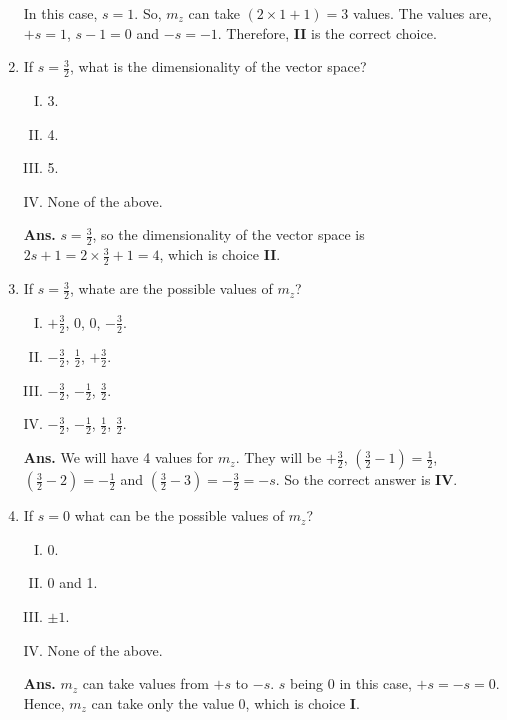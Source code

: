\documentclass[12pt]{article}
\newcommand\half{\frac{1}{2}}
\newcommand\thalf{\frac{3}{2}}
\begin{document}
\begin{enumerate}[1.]
In this case, $s=1$. So, $m_z$ can take $(2 \times 1 + 1) = 3$ values. The values are, $+s = 1$, $ s-1 = 0$ and $-s = -1$. Therefore, \textbf{II} is the correct choice.
\item If $s=\thalf$, what is the dimensionality of the vector space?
       \begin{enumerate}[I.]
              \item 3.
              \item 4.
              \item 5.
              \item None of the above. \\ \newline
       \end{enumerate}
\textbf{Ans.} $s=\thalf$, so the dimensionality of the vector space is $2s+1 = 2 \times \thalf + 1 = 4$, which is choice \textbf{II}. \newline
\item If $s=\thalf$, whate are the possible values of $m_z$?
       \begin{enumerate}[I.]
              \item $+\thalf$, 0, 0, $-\thalf$.
              \item $-\thalf$, $\half$, $+\thalf$.
              \item $-\thalf$, $-\half$, $\thalf$.
              \item $-\thalf$, $-\half$, $\half$, $\thalf$. \\ \newline
       \end{enumerate} 
\textbf{Ans.} We will have 4 values for $m_z$. They will be $+\thalf$, $\left(\thalf - 1 \right) = \half$, $\left(\thalf - 2 \right) = -\half$ and $\left(\thalf - 3 \right) = -\thalf = - s$. \newline
So the correct answer is \textbf{IV}. \\ \newline
\item If $s=0$ what can be the possible values of $m_z$?
       \begin{enumerate}[I.]
              \item 0.
              \item 0 and 1.
              \item $\pm 1$.
              \item None of the above. \\ \newline
       \end{enumerate}
\textbf{Ans.} $m_z$ can take values from $+s$ to $-s$. $s$ being 0 in this case, $+s=-s=0$. Hence, $m_z$ can take only the value 0, which is choice \textbf{I}. \\ \newline


\end{enumerate}
\end{document}
